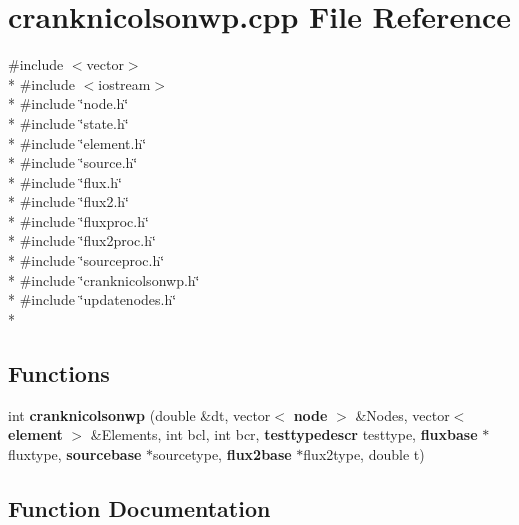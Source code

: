 \section{cranknicolsonwp.\-cpp File Reference}
\label{cranknicolsonwp_8cpp}
{\ttfamily \#include $<$vector$>$}\\*
{\ttfamily \#include $<$iostream$>$}\\*
{\ttfamily \#include \char`\"{}node.\-h\char`\"{}}\\*
{\ttfamily \#include \char`\"{}state.\-h\char`\"{}}\\*
{\ttfamily \#include \char`\"{}element.\-h\char`\"{}}\\*
{\ttfamily \#include \char`\"{}source.\-h\char`\"{}}\\*
{\ttfamily \#include \char`\"{}flux.\-h\char`\"{}}\\*
{\ttfamily \#include \char`\"{}flux2.\-h\char`\"{}}\\*
{\ttfamily \#include \char`\"{}fluxproc.\-h\char`\"{}}\\*
{\ttfamily \#include \char`\"{}flux2proc.\-h\char`\"{}}\\*
{\ttfamily \#include \char`\"{}sourceproc.\-h\char`\"{}}\\*
{\ttfamily \#include \char`\"{}cranknicolsonwp.\-h\char`\"{}}\\*
{\ttfamily \#include \char`\"{}updatenodes.\-h\char`\"{}}\\*
\subsection*{Functions}
\begin{DoxyCompactItemize}
\item 
int {\bf cranknicolsonwp} (double \&dt, vector$<$ {\bf node} $>$ \&Nodes, vector$<$ {\bf element} $>$ \&Elements, int bcl, int bcr, {\bf testtypedescr} testtype, {\bf fluxbase} $\ast$fluxtype, {\bf sourcebase} $\ast$sourcetype, {\bf flux2base} $\ast$flux2type, double t)
\end{DoxyCompactItemize}


\subsection{Function Documentation}
